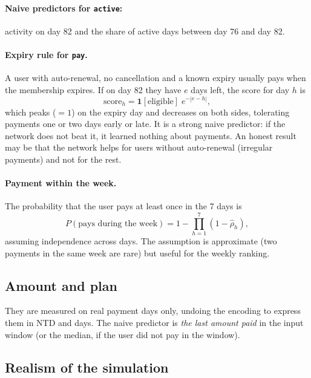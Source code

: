 \documentclass[11pt]{article}
\newcommand{\ind}{\mathbf{1}}
\newcommand{\code}[1]{\texttt{#1}}
\begin{document}
\paragraph{Naive predictors for \code{active}:} activity on day 82 and the share of active days between day 76 and day 82.

\paragraph{Expiry rule for \code{pay}.} A user with auto-renewal, no cancellation and a known expiry usually pays when the membership expires. If on day 82 they have $e$ days left, the score for day $h$ is
\begin{equation}
\text{score}_h = \ind[\text{eligible}]\; e^{-|e - h|},
\end{equation}
which peaks ($=1$) on the expiry day and decreases on both sides, tolerating payments one or two days early or late. It is a strong naive predictor: if the network does not beat it, it learned nothing about payments. An honest result may be that the network helps for users without auto-renewal (irregular payments) and not for the rest.

\paragraph{Payment within the week.} The probability that the user pays at least once in the 7 days is
\begin{equation}
P(\text{pays during the week}) = 1 - \prod_{h=1}^{7} (1 - \hat\rho_h),
\end{equation}
assuming independence across days. The assumption is approximate (two payments in the same week are rare) but useful for the weekly ranking.

\subsection{Amount and plan}

They are measured on real payment days only, undoing the encoding to express them in NTD and days. The naive predictor is \emph{the last amount paid} in the input window (or the median, if the user did not pay in the window).

\subsection{Realism of the simulation}
\end{document}
